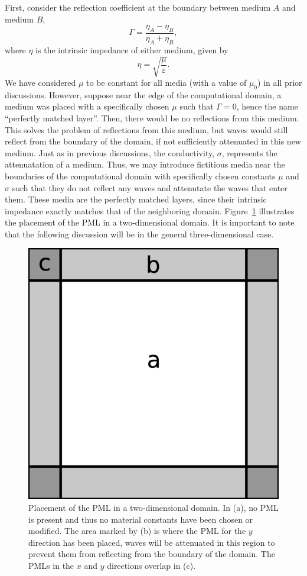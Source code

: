 \documentclass[12pt,twocolumn]{article}
\begin{document}
First, consider the reflection coefficient at the boundary between medium $A$ and medium $B$,
\begin{equation}
\Gamma = \frac{\eta_A-\eta_B}{\eta_A+\eta_B},
\end{equation}
where $\eta$ is the intrinsic impedance of either medium, given by
\begin{equation}
\eta=\sqrt{\frac{\mu}{\varepsilon}}.
\end{equation}
We have considered $\mu$ to be constant for all media (with a value of $\mu_0$) in all prior discussions. However, suppose near the edge of the computational domain, a medium was placed with a specifically chosen $\mu$ such that $\Gamma=0$, hence the name ``perfectly matched layer''. Then, there would be no reflections from this medium. This solves the problem of reflections from this medium, but waves would still reflect from the boundary of the domain, if not sufficiently attenuated in this new medium. Just as in previous discussions, the conductivity, $\sigma$, represents the attenuatation of a medium. Thus, we may introduce fictitious media near the boundaries of the computational domain with specifically chosen constants $\mu$ and $\sigma$ such that they do not reflect any waves and attenutate the waves that enter them. These media are the perfectly matched layers, since their intrinsic impedance exactly matches that of the neighboring domain. Figure~\ref{fig:PML} illustrates the placement of the PML in a two-dimensional domain. It is important to note that the following discussion will be in the general three-dimensional case.
\begin{figure}
\centering
\includegraphics[width=0.5\linewidth]{PML.eps}
\caption{Placement of the PML in a two-dimensional domain. In (a), no PML is present and thus no material constants have been chosen or modified. The area marked by (b) is where the PML for the $y$ direction has been placed, waves will be attenuated in this region to prevent them from reflecting from the boundary of the domain. The PMLs in the $x$ and $y$ directions overlap in (c).}
\label{fig:PML}
\end{figure}
\end{document}
